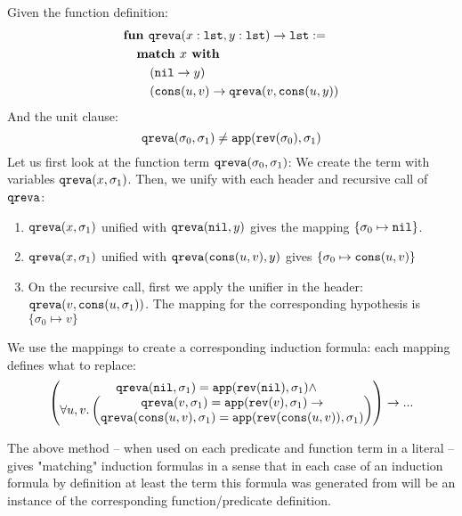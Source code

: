 \begin{example}\label{ex:3}
	Given the function definition:
	\begin{equation}
	\begin{aligned}
	\nonumber
	&\textbf{fun } \qreva (x : \lst, y : \lst) \rightarrow \lst :=\\
	&\tab\textbf{match } x \textbf{ with}\\
	&\tab\tab(\nil\rightarrow y)\\ &\tab\tab(\cons(u,v)\rightarrow\qreva(v,\cons(u,y))\end{aligned}\end{equation}
	And the unit clause:
	$$\mathtt{qreva}(\sigma_0,\sigma_1)\neq\mathtt{app}(\mathtt{rev}(\sigma_0),\sigma_1)$$
	Let us first look at the function term $\mathtt{qreva}(\sigma_0,\sigma_1)$:
	We create the term with variables $\mathtt{qreva}(x,\sigma_1)$. Then, we unify with each
	header and recursive call of $\mathtt{qreva}$:
	\begin{enumerate}
		\item $\mathtt{qreva}(x,\sigma_1)$ unified with $\mathtt{qreva}(\mathtt{nil},y)$ gives the mapping $\{\sigma_0\mapsto\mathtt{nil}\}$.
		\item $\mathtt{qreva}(x,\sigma_1)$ unified with $\mathtt{qreva}(\mathtt{cons}(u,v),y)$ gives $\{\sigma_0\mapsto\mathtt{cons}(u,v)\}$
		\item On the recursive call, first we apply the unifier in the header: $\mathtt{qreva}(v, \mathtt{cons}(u,\sigma_1))$. The mapping for the corresponding hypothesis is $\{\sigma_0\mapsto v\}$
	\end{enumerate}
	We use the mappings to create a corresponding induction formula: each mapping defines what to replace:
	$$\begin{pmatrix}
	\mathtt{qreva}(\mathtt{nil},\sigma_1)=\mathtt{app}(\mathtt{rev}(\mathtt{nil}),\sigma_1)\land\\
	\forall u,v.\begin{pmatrix}\mathtt{qreva}(v,\sigma_1)=\mathtt{app}(\mathtt{rev}(v),\sigma_1)\rightarrow\\
	\mathtt{qreva}(\mathtt{cons}(u,v),\sigma_1)=\mathtt{app}(\mathtt{rev}(\mathtt{cons}(u,v)),\sigma_1)\end{pmatrix}
	\end{pmatrix}\rightarrow...$$
\end{example}

The above method -- when used on each predicate and function term in a literal -- gives "matching" induction formulas in a sense that in each case of an induction formula by definition at least the term this formula was generated from will be an instance of the corresponding function/predicate definition.

